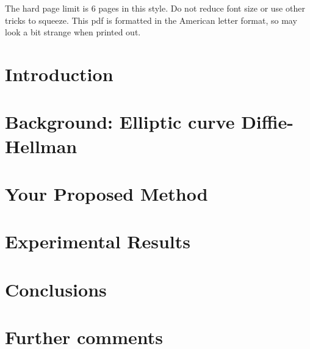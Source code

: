 


%
\maketitle
%

The hard page limit is 6 pages in this style. Do not reduce font size
or use other tricks to squeeze. This pdf is formatted in the American letter format, so may look a bit strange when printed out.

\begin{abstract}

\end{abstract}

\section{Introduction}\label{sec:intro}


\section{Background: Elliptic curve Diffie-Hellman}\label{sec:background}


\section{Your Proposed Method}\label{sec:yourmethod}


\section{Experimental Results}\label{sec:exp}


\section{Conclusions}


\section{Further comments}







